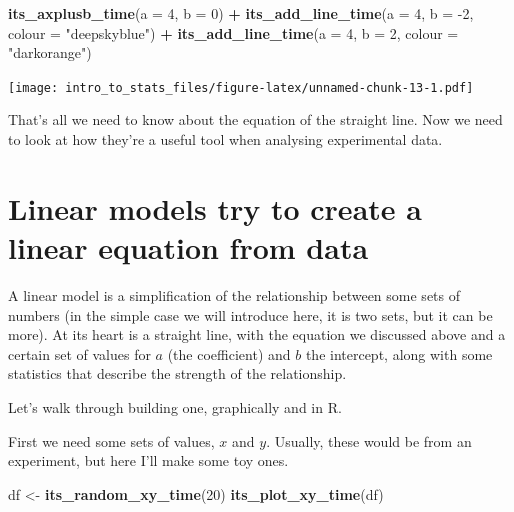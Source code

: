 \documentclass[
]{book}
\newenvironment{Shaded}{\begin{snugshade}}{\end{snugshade}}
\newcommand{\DataTypeTok}[1]{\textcolor[rgb]{0.13,0.29,0.53}{#1}}
\newcommand{\DecValTok}[1]{\textcolor[rgb]{0.00,0.00,0.81}{#1}}
\newcommand{\KeywordTok}[1]{\textcolor[rgb]{0.13,0.29,0.53}{\textbf{#1}}}
\newcommand{\NormalTok}[1]{#1}
\newcommand{\OperatorTok}[1]{\textcolor[rgb]{0.81,0.36,0.00}{\textbf{#1}}}
\newcommand{\StringTok}[1]{\textcolor[rgb]{0.31,0.60,0.02}{#1}}
\begin{document}
\begin{Shaded}
\begin{Highlighting}[]
\KeywordTok{its_axplusb_time}\NormalTok{(}\DataTypeTok{a =} \DecValTok{4}\NormalTok{, }\DataTypeTok{b =} \DecValTok{0}\NormalTok{) }\OperatorTok{+}\StringTok{ }
\StringTok{  }\KeywordTok{its_add_line_time}\NormalTok{(}\DataTypeTok{a =} \DecValTok{4}\NormalTok{, }\DataTypeTok{b =} \DecValTok{-2}\NormalTok{, }\DataTypeTok{colour =} \StringTok{"deepskyblue"}\NormalTok{) }\OperatorTok{+}
\StringTok{  }\KeywordTok{its_add_line_time}\NormalTok{(}\DataTypeTok{a =} \DecValTok{4}\NormalTok{, }\DataTypeTok{b =} \DecValTok{2}\NormalTok{, }\DataTypeTok{colour =} \StringTok{"darkorange"}\NormalTok{)}
\end{Highlighting}
\end{Shaded}

\texttt{[image: intro\_to\_stats\_files/figure-latex/unnamed-chunk-13-1.pdf]}

That's all we need to know about the equation of the straight line. Now we need to look at how they're a useful tool when analysing experimental data.

\hypertarget{linear-models-try-to-create-a-linear-equation-from-data}{%
\section{Linear models try to create a linear equation from data}\label{linear-models-try-to-create-a-linear-equation-from-data}}

A linear model is a simplification of the relationship between some sets of numbers (in the simple case we will introduce here, it is two sets, but it can be more). At its heart is a straight line, with the equation we discussed above and a certain set of values for \(a\) (the coefficient) and \(b\) the intercept, along with some statistics that describe the strength of the relationship.

Let's walk through building one, graphically and in R.

First we need some sets of values, \(x\) and \(y\). Usually, these would be from an experiment, but here I'll make some toy ones.

\begin{Shaded}
\begin{Highlighting}[]
\NormalTok{df <-}\StringTok{ }\KeywordTok{its_random_xy_time}\NormalTok{(}\DecValTok{20}\NormalTok{)}
\KeywordTok{its_plot_xy_time}\NormalTok{(df)}
\end{Highlighting}
\end{Shaded}
\end{document}
